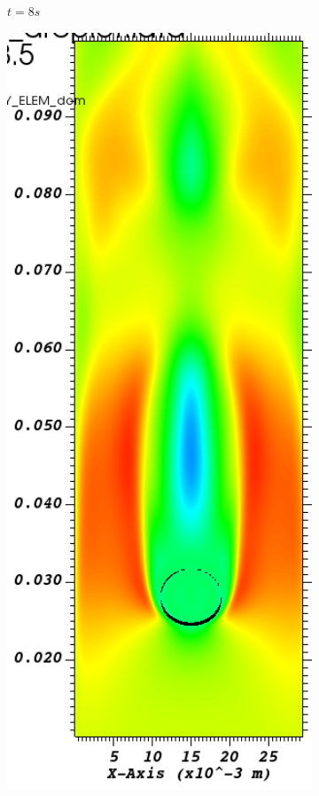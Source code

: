 \begin{figure}[H]
\begin{subfigure}[ht!]{0.18\textwidth}
		\caption{$t=8s$}
	\end{subfigure}
	\begin{subfigure}[ht!]{0.18\textwidth}
		\centering
		\includegraphics[width=1\textwidth]{fig_plateau_vitesse2/visit0020.png}

\end{subfigure}
\end{figure}
